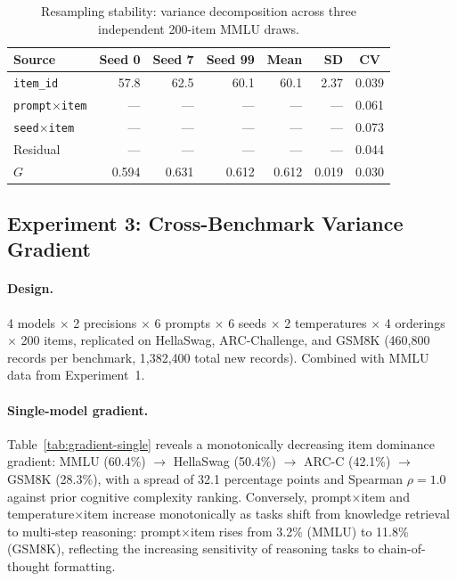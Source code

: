 \documentclass[letterpaper]{article}
\newcommand{\gcoeff}{\ensuremath{G}}
\newcommand{\pct}{\%}
\begin{document}
\begin{table}[t]
\centering
\caption{Resampling stability: variance decomposition across three independent 200-item MMLU draws.}
\label{tab:resampling}
\small
\begin{tabular}{lrrrrrc}
\toprule
Source & Seed 0 & Seed 7 & Seed 99 & Mean & SD & CV \\
\midrule
\texttt{item\_id} & 57.8 & 62.5 & 60.1 & 60.1 & 2.37 & 0.039 \\
\texttt{prompt$\times$item} & --- & --- & --- & --- & --- & 0.061 \\
\texttt{seed$\times$item}  & --- & --- & --- & --- & --- & 0.073 \\
Residual                    & --- & --- & --- & --- & --- & 0.044 \\
\midrule
$\gcoeff{}$ & 0.594 & 0.631 & 0.612 & 0.612 & 0.019 & 0.030 \\
\bottomrule
\end{tabular}
\end{table}

\subsection{Experiment 3: Cross-Benchmark Variance Gradient}

\paragraph{Design.}
4 models $\times$ 2 precisions $\times$ 6 prompts $\times$ 6 seeds $\times$ 2 temperatures $\times$ 4 orderings $\times$ 200 items, replicated on HellaSwag, ARC-Challenge, and GSM8K (460,800 records per benchmark, 1,382,400 total new records).
Combined with MMLU data from Experiment~1.

\paragraph{Single-model gradient.}
Table~\ref{tab:gradient-single} reveals a monotonically decreasing item dominance gradient: MMLU (60.4\pct{}) $\to$ HellaSwag (50.4\pct{}) $\to$ ARC-C (42.1\pct{}) $\to$ GSM8K (28.3\pct{}), with a spread of 32.1 percentage points and Spearman $\rho = 1.0$ against prior cognitive complexity ranking.
Conversely, prompt$\times$item and temperature$\times$item increase monotonically as tasks shift from knowledge retrieval to multi-step reasoning: prompt$\times$item rises from 3.2\pct{} (MMLU) to 11.8\pct{} (GSM8K), reflecting the increasing sensitivity of reasoning tasks to chain-of-thought formatting.
\end{document}
